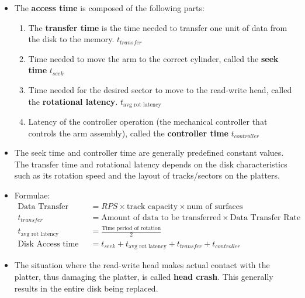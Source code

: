 \documentclass{article}
\theoremstyle{plain}
\theoremstyle{definition}
\begin{document}
\begin{itemize}
    \item The \textbf{access time} is composed of the following parts:
    \begin{enumerate}
    
        \item The \textbf{transfer time} is the time needed to transfer one unit of data from the disk to the memory. $t_{transfer}$
        
        \item Time needed to move the arm to the correct cylinder, called the \textbf{seek time} $t_{seek}$
        
        \item Time needed for the desired sector to move to the read-write head, called the \textbf{rotational latency}. $t_{\text{avg rot latency}}$
        
        \item Latency of the controller operation (the mechanical controller that controls the arm assembly), called the \textbf{controller time} $t_{controller}$
        
    \end{enumerate}
    
    \item The seek time and controller time are generally predefined constant values. The transfer time and rotational latency depends on the disk characteristics such as its rotation speed and the layout of tracks/sectors on the platters. 
    
    \item Formulae:
    \begin{align*}
        \text{Data Transfer Rate} &= RPS \times \text{track capacity} \times \text{num of surfaces}\\
        t_{transfer} &= \text{Amount of data to be transferred}\times \text{Data Transfer Rate}\\
        t_{\text{avg rot latency}} &= \frac{\text{Time period of rotation}}{2}\\
        \text{Disk Access time} &= t_{seek} + t_{\text{avg rot latency}} + t_{transfer} + t_{controller}
    \end{align*}
    
    \item The situation where the read-write head makes actual contact with the platter, thus damaging the platter, is called \textbf{head crash}. This generally results in the entire disk being replaced. 
    

\end{itemize}
\end{document}
